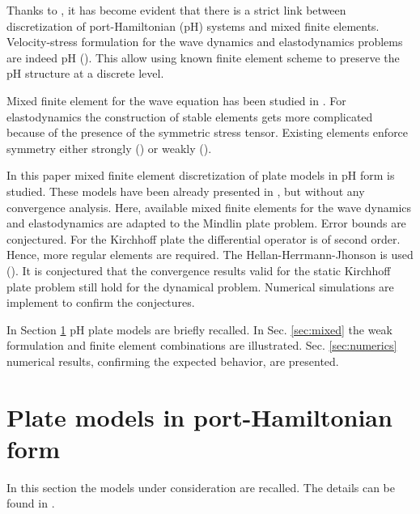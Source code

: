 \documentclass{ifacconf}
\begin{document}
Thanks to \cite{CardosoRibeiro2018}, it has become evident that there is a strict link between  discretization of port-Hamiltonian (pH) systems and mixed finite elements. Velocity-stress formulation for the wave dynamics and elastodynamics problems are indeed pH (\cite{Kirby2015}). This allow using known finite element scheme to preserve the pH structure at a discrete level.

Mixed finite element for the wave equation has been studied in \cite{Geveci,becacheWave}. For elastodynamics the construction of stable elements gets more complicated because of the presence of the symmetric stress tensor. Existing elements enforce symmetry either strongly (\cite{becacheElas}) or weakly (\cite{ArnoldWeak}).

In this paper mixed finite element discretization of plate models in pH form is studied. These models have been already presented in \cite{BRUGNOLI2019940,BRUGNOLI2019961}, but without any convergence analysis. Here, available mixed finite elements for the wave dynamics and elastodynamics are adapted to the Mindlin plate problem. Error bounds are conjectured. For the Kirchhoff plate the differential operator is of second order. Hence, more regular elements are required. The Hellan-Herrmann-Jhonson is used (\cite{Blum1990}). It is conjectured that the convergence results valid for the static Kirchhoff plate problem still hold for the  dynamical problem. Numerical simulations are implement to confirm the conjectures.

In Section \ref{sec:pHplates} pH plate models are briefly recalled. In Sec. \ref{sec:mixed} the weak formulation and finite element combinations are illustrated. Sec. \ref{sec:numerics} numerical results, confirming the expected behavior, are presented.

\section{Plate models in port-Hamiltonian form}
\label{sec:pHplates}

In this section the models under consideration are recalled. The details can be found in  \cite{BRUGNOLI2019961,BRUGNOLI2019940}. 
\end{document}
